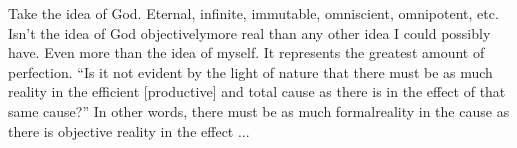 \documentclass{article}
\begin{document}
\begin{spacing}{1.2}
\begin{itemize}
        Take the idea of God. Eternal, infinite, immutable, omniscient, 
        omnipotent, etc. Isn't the idea of God objectively\footnotemark[1] more 
        real than any other idea I could possibly have. Even more than the idea 
        of myself. It represents the greatest amount of perfection. ``Is it not 
        evident by the light of nature that there must be as much reality in 
        the efficient [productive] and total cause as there is in the effect of 
        that same cause?'' In other words, there must be as much 
        formal\footnotemark[2] reality in the cause as there is objective 
        reality in the effect ...
        
    \end{itemize}
    \end{spacing}
    
\end{document}
